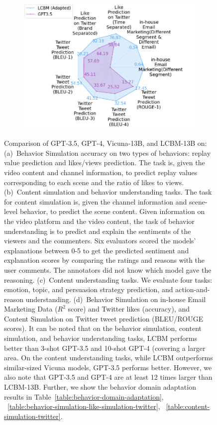 \begin{figure}[!t]
{{\begin{subfigure}[b]{0.25\textwidth}
\includegraphics[width=1\textwidth]{images/domain-adaptation_1.pdf}\caption{}    
\end{subfigure}
}}
    \caption{
    \label{fig:capabilities-radarplot}
    Comparison of GPT-3.5, GPT-4, Vicuna-13B, and LCBM-13B on: (a)~Behavior Simulation accuracy on two types of behaviors: replay value prediction and likes/views prediction. The task is, given the video content and channel information, to predict replay values corresponding to each scene and the ratio of likes to views.
    (b)~Content simulation and behavior understanding tasks. The task for content simulation is, given the channel information and scene-level behavior, to predict the scene content. Given information on the video platform and the video content, the task of behavior understanding is to predict and explain the sentiments of the viewers and the commenters. %
    Six evaluators scored the models' explanations between 0-5 to get the predicted sentiment and explanation scores by comparing the ratings and reasons with the user comments. The annotators did not know which model gave the reasoning.
    (c)~Content understanding tasks. We evaluate four tasks: emotion, topic, and persuasion strategy prediction, and action-and-reason understanding.
    (d)~Behavior Simulation on in-house Email Marketing Data ($R^2$ score) and Twitter likes (accuracy), and Content Simulation on Twitter tweet prediction (BLEU/ROUGE scores).
    It can be noted that on the behavior simulation, content simulation, and behavior understanding tasks, LCBM performs better than 3-shot GPT-3.5 and 10-shot GPT-4 (covering a larger area. On the content understanding tasks, while LCBM outperforms similar-sized Vicuna models, GPT-3.5 performs better. However, we also note that GPT-3.5 and GPT-4 are at least 12 times larger than LCBM-13B. Further, we show the behavior domain adaptation results in Table~\ref{table:behavior-domain-adaptation}, ~\ref{table:behavior-simulation-like-simulation-twitter}, ~\ref{table:content-simulation-twitter}.
    }
\end{figure}




